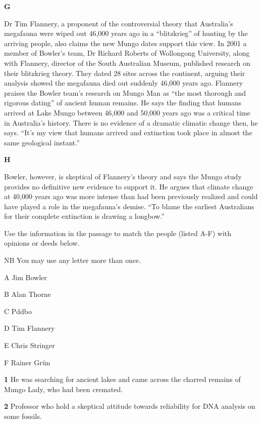 \documentclass{../templateReading/cdreading}
\begin{document}
\textbf{G}\par

Dr Tim Flannery, a proponent of the controversial theory that Australia’s megafauna were wiped out 46,000 years ago in a “blitzkrieg” of hunting by the arriving people, also claims the new Mungo dates support this view. In 2001 a member of Bowler’s team, Dr Richard Roberts of Wollongong University, along with Flannery, director of the South Australian Museum, published research on their blitzkrieg theory. They dated 28 sites across the continent, arguing their analysis showed the megafauna died out suddenly 46,000 years ago. Flannery praises the Bowler team’s research on Mungo Man as “the most thorough and rigorous dating” of ancient human remains. He says the finding that humans arrived at Lake Mungo between 46,000 and 50,000 years ago was a critical time in Australia’s history. There is no evidence of a dramatic climatic change then, he says. “It’s my view that humans arrived and extinction took place in almost the same geological instant.”

\textbf{H}\par

Bowler, however, is skeptical of Flannery’s theory and says the Mungo study provides no definitive new evidence to support it. He argues that climate change at 40,000 years ago was more intense than had been previously realized and could have played a role in the megafauna’s demise. “To blame the earliest Australians for their complete extinction is drawing a longbow.”


Use the information in the passage to match the people (listed A-F) with opinions or deeds below.


NB  You may use any letter more than once.

A     Jim Bowler

B     Alan Thorne

C     Pddbo

D     Tim Flannery

E     Chris Stringer

F     Rainer Grün

\textbf{1} He was searching for ancient lakes and came across the charred remains of Mungo Lady, who had been cremated.

\textbf{2} Professor who hold a skeptical attitude towards reliability for DNA analysis on some fossils.
\end{document}
